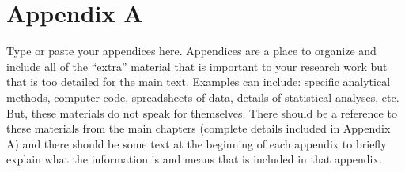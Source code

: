 \section*{Appendix A} \label{sectionAppendixA}

Type or paste your appendices here. Appendices are a place to organize and include all of the “extra” material that is important to your research work but that is too detailed for the main text.  Examples can include: specific analytical methods, computer code, spreadsheets of data, details of statistical analyses, etc.  But, these materials do not speak for themselves.  There should be a reference to these materials from the main chapters (complete details included in Appendix A) and there should be some text at the beginning of each appendix to briefly explain what the information is and means that is included in that appendix.

